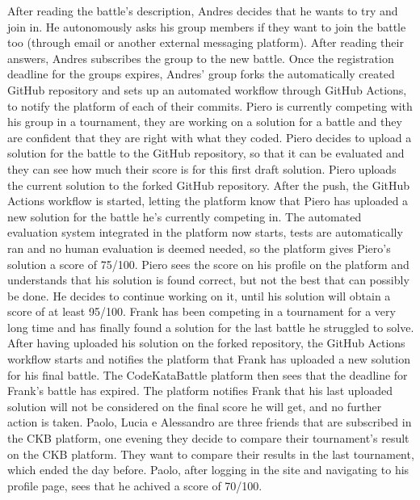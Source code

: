 \documentclass{article}
\newcounter{subsubsubsection}[subsubsection]
\begin{document}
{After reading the battle's description, Andres decides that he wants to try and join in. He autonomously asks his group members if they want to join
 the battle too (through email or another external messaging platform).
After reading their answers, Andres subscribes the group to the new battle.
Once the registration deadline for the groups expires, Andres' group forks the automatically created GitHub repository and sets 
up an automated workflow through GitHub Actions, to notify the platform of each of their commits.
Piero is currently competing with his group in a tournament, they are working on a solution for a battle and they are confident that they are right with what they coded. 
Piero decides to upload a solution for the battle to the GitHub repository, so that it can be evaluated and they can see how much their score is for this first draft solution.
Piero uploads the current solution to the forked GitHub repository. 
After the push, the GitHub Actions workflow is started, letting the platform know that Piero has uploaded a new solution for the battle he's currently competing in.
The automated evaluation system integrated in the platform now starts, tests are automatically ran and no human evaluation is deemed needed, 
so the platform gives Piero's solution a score of 75/100.
Piero sees the score on his profile on the platform and understands that his solution is found correct, but not the best that can possibly be done. 
He decides to continue working on it, until his solution will obtain a score of at least 95/100.
Frank has been competing in a tournament for a very long time and has finally found a solution for the last battle he struggled to solve. 
After having uploaded his solution on the forked repository, the GitHub Actions workflow starts and notifies the platform that Frank has uploaded a new solution for his final battle.
The CodeKataBattle platform then sees that the deadline for Frank's battle has expired. 
The platform notifies Frank that his last uploaded solution will not be considered on the final score he will get, and no further action is taken.
Paolo, Lucia e Alessandro are three friends that are subscribed in the CKB platform, one evening they decide to compare their tournament's result on the CKB platform. 
They want to compare their results in the last tournament, which ended the day before.
Paolo, after logging in the site and navigating to his profile page, sees that he achived a score of 70/100. 
}
\end{document}
